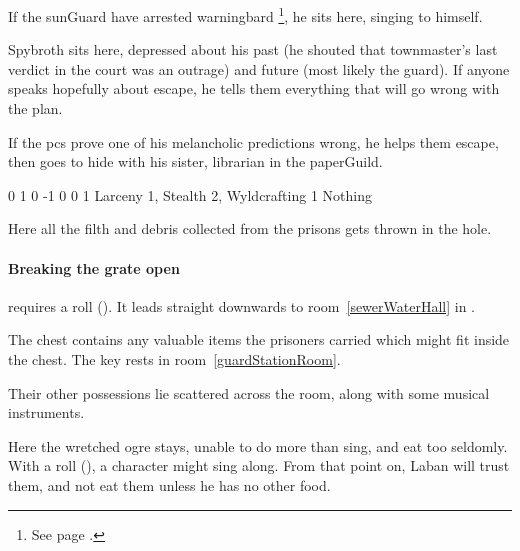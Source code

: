 \begin{multicols}{2}


If the \gls{sunGuard} have arrested \gls{warningbard}%
\footnote{See page \pageref{warningbard}.},
he sits here, singing to himself.


Spybroth sits here, depressed about his past (he shouted that \gls{townmaster}'s last verdict in the \gls{court} was an outrage) and future (most likely the \gls{guard}).
If anyone speaks hopefully about escape, he tells them everything that will go wrong with the plan.

If the \glspl{pc} prove one of his melancholic predictions wrong, he helps them escape, then goes to hide with his sister, \gls{librarian} in the \gls{paperGuild}.

{0}%
{1}%
{{0}%
{-1}%
{0}}%
{0}%
{1}%
{Larceny 1, Stealth 2, Wyldcrafting 1}%
{Nothing}%
{}
\label{spyBroth}


Here all the filth and debris collected from the prisons gets thrown in the hole.

\paragraph{Breaking the grate open}
requires a  roll (\tn[10]).
It leads straight downwards to room~\vref{sewerWaterHall} in .


The chest contains any valuable items the prisoners carried which might fit inside the chest.
The key rests in room~\ref{guardStationRoom}.

Their other possessions lie scattered across the room, along with some musical instruments.


Here the wretched ogre stays, unable to do more than sing, and eat too seldomly.
With a  roll (\tn[12]), a character might sing along.
From that point on, Laban will trust them, and not eat them unless he has no other food.


\end{multicols}
